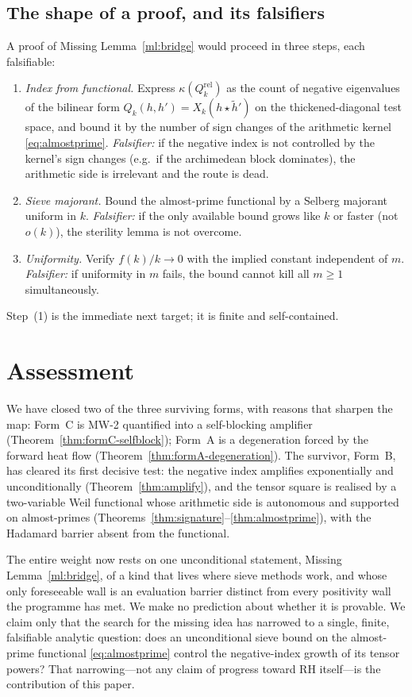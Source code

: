 \documentclass[11pt]{amsart}
\theoremstyle{definition}
\theoremstyle{remark}
\begin{document}
\subsection{The shape of a proof, and its falsifiers}
A proof of Missing Lemma~\ref{ml:bridge} would proceed in three steps, each
falsifiable:
\begin{enumerate}[\rm(1)]
\item \emph{Index from functional.} Express $\kappa(Q_k^{\mathrm{rel}})$ as
the count of negative eigenvalues of the bilinear form
$Q_k(h,h')=X_k(h\star\tilde h')$ on the thickened-diagonal test space, and
bound it by the number of sign changes of the arithmetic kernel
\eqref{eq:almostprime}. \emph{Falsifier:} if the negative index is not
controlled by the kernel's sign changes (e.g.\ if the archimedean block
dominates), the arithmetic side is irrelevant and the route is dead.
\item \emph{Sieve majorant.} Bound the almost-prime functional by a Selberg
majorant uniform in $k$. \emph{Falsifier:} if the only available bound grows
like $k$ or faster (not $o(k)$), the sterility lemma is not overcome.
\item \emph{Uniformity.} Verify $f(k)/k\to0$ with the implied constant
independent of $m$. \emph{Falsifier:} if uniformity in $m$ fails, the bound
cannot kill all $m\ge1$ simultaneously.
\end{enumerate}
Step~(1) is the immediate next target; it is finite and self-contained.

\section{Assessment}\label{sec:assessment}

We have closed two of the three surviving forms, with reasons that sharpen
the map: Form~C is MW-2 quantified into a self-blocking amplifier
(Theorem~\ref{thm:formC-selfblock}); Form~A is a degeneration forced by the
forward heat flow (Theorem~\ref{thm:formA-degeneration}). The survivor,
Form~B, has cleared its first decisive test: the negative index amplifies
exponentially and unconditionally (Theorem~\ref{thm:amplify}), and the
tensor square is realised by a two-variable Weil functional whose
arithmetic side is autonomous and supported on almost-primes
(Theorems~\ref{thm:signature}--\ref{thm:almostprime}), with the Hadamard
barrier absent from the functional.

The entire weight now rests on one unconditional statement, Missing
Lemma~\ref{ml:bridge}, of a kind that lives where sieve methods work, and
whose only foreseeable wall is an evaluation barrier distinct from every
positivity wall the programme has met. We make no prediction about whether
it is provable. We claim only that the search for the missing idea has
narrowed to a single, finite, falsifiable analytic question: does an
unconditional sieve bound on the almost-prime functional
\eqref{eq:almostprime} control the negative-index growth of its tensor
powers? That narrowing---not any claim of progress toward RH itself---is
the contribution of this paper.
\end{document}
